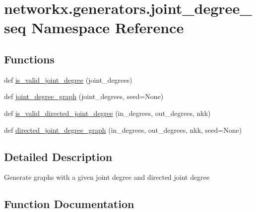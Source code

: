 \hypertarget{namespacenetworkx_1_1generators_1_1joint__degree__seq}{}\section{networkx.\+generators.\+joint\+\_\+degree\+\_\+seq Namespace Reference}
\label{namespacenetworkx_1_1generators_1_1joint__degree__seq}
\subsection*{Functions}
\begin{DoxyCompactItemize}
\item 
def \hyperlink{namespacenetworkx_1_1generators_1_1joint__degree__seq_a1dac8f1785811efb523049d51ec554e1}{is\+\_\+valid\+\_\+joint\+\_\+degree} (joint\+\_\+degrees)
\item 
def \hyperlink{namespacenetworkx_1_1generators_1_1joint__degree__seq_ab07b587a34ff4300e8b9d7b03bd39067}{joint\+\_\+degree\+\_\+graph} (joint\+\_\+degrees, seed=None)
\item 
def \hyperlink{namespacenetworkx_1_1generators_1_1joint__degree__seq_abed44ed09f640e2cec94975588d74505}{is\+\_\+valid\+\_\+directed\+\_\+joint\+\_\+degree} (in\+\_\+degrees, out\+\_\+degrees, nkk)
\item 
def \hyperlink{namespacenetworkx_1_1generators_1_1joint__degree__seq_abb3a3a00b32196156227d478e68ff0e8}{directed\+\_\+joint\+\_\+degree\+\_\+graph} (in\+\_\+degrees, out\+\_\+degrees, nkk, seed=None)
\end{DoxyCompactItemize}


\subsection{Detailed Description}
\begin{DoxyVerb}Generate graphs with a given joint degree and directed joint degree\end{DoxyVerb}
 

\subsection{Function Documentation}
\mbox{\label{namespacenetworkx_1_1generators_1_1joint__degree__seq_abb3a3a00b32196156227d478e68ff0e8}} 
